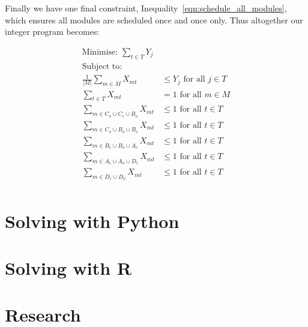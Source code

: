 Finally we have one final constraint, Inequality~\ref{eqn:schedule_all_modules},
which ensures all modules are scheduled once and once only.
Thus altogether our integer program becomes:

\begin{align}
\text{Minimise: } \sum_{t \in T} Y_j & \\
\text{Subject to: } & \nonumber \\
\frac{1}{|M|} \sum_{m \in M} X_{mt} &\leq Y_j \text{ for all } j \in T\\\label{eqn:auxiliary}
\sum_{t \in T} X_{mt} &= 1 \text{ for all } m \in M\\\label{eqn:schedule_all_modules}
\sum_{m \in C_o \cup C_c \cup B_o} X_{mt} &\leq 1 \text{ for all } t \in T\\\label{eqn:clique1}
\sum_{m \in C_o \cup B_o \cup B_c} X_{mt} &\leq 1 \text{ for all } t \in T\\\label{eqn:clique2}
\sum_{m \in B_c \cup B_o \cup A_c} X_{mt} &\leq 1 \text{ for all } t \in T\\\label{eqn:clique3}
\sum_{m \in A_c \cup A_o \cup D_c} X_{mt} &\leq 1 \text{ for all } t \in T\\\label{eqn:clique4}
\sum_{m \in D_c \cup D_o} X_{mt} & \leq 1 \text{ for all } t \in T\\\label{eqn:clique5}
\end{align}


\section{Solving with Python}\label{sec:solving-with-python}

\section{Solving with R}\label{sec:solving-with-R}

\section{Research}\label{sec:research}
